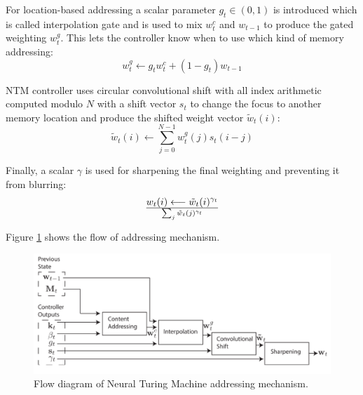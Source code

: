 \documentclass[acmsmall]{acmart}
\begin{document}
For location-based addressing a scalar parameter $g_t \in (0,1)$ is introduced which is called interpolation gate and is used to mix $w_t^c$ and $w_{t-1}$ to produce the gated weighting $w_t^g$. This lets the controller know when to use which kind of memory addressing:
\begin{equation}
w_t^g \longleftarrow g_t w_t^c + (1-g_t)w_{t-1}
\end{equation}

NTM controller uses circular convolutional shift with all index arithmetic computed modulo $N$ with a shift vector $s_t$ to change the focus to another memory location and produce the shifted weight vector $\tilde{w}_t(i)$:
\begin{equation}
\tilde{w}_t(i) \longleftarrow \sum_{j=0}^{N-1} w_t^g(j)s_t(i-j)
\end{equation}

Finally, a scalar $\gamma$ is used for sharpening the final weighting and preventing it from blurring:
\begin{equation}
w_t(i) \longleftarrow {\tilde{w}_t(i)^{\gamma_t}} \over {\sum_{j} \tilde{w}_t(j)^{\gamma_t}}
\end{equation}

Figure \ref{fig:ntmaddressing} shows the flow of addressing mechanism.

\begin{figure}[h]
	\centering
	\includegraphics[scale=0.15]{figures/ntmaddressing}
	\caption{Flow diagram of Neural Turing Machine addressing mechanism.}
	\label{fig:ntmaddressing}
\end{figure}
\end{document}

